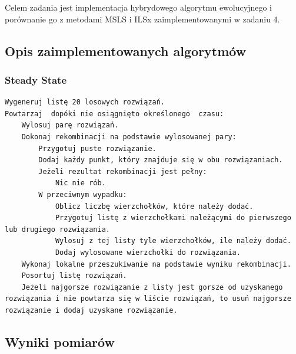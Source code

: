 \documentclass[a4paper]{article}
\begin{document}
Celem zadania jest implementacja hybrydowego algorytmu ewolucyjnego i porównanie go z metodami MSLS i ILSx zaimplementowanymi w zadaniu 4.

\subsection{Opis zaimplementowanych algorytmów}

\subsubsection{Steady State}

\begin{lstlisting}
Wygeneruj listę 20 losowych rozwiązań.
Powtarzaj  dopóki nie osiągnięto określonego  czasu:
    Wylosuj parę rozwiązań.
    Dokonaj rekombinacji na podstawie wylosowanej pary:
        Przygotuj puste rozwiązanie.
        Dodaj każdy punkt, który znajduje się w obu rozwiązaniach.
        Jeżeli rezultat rekombinacji jest pełny:
            Nic nie rób.
        W przeciwnym wypadku:
            Oblicz liczbę wierzchołków, które należy dodać.
            Przygotuj listę z wierzchołkami należącymi do pierwszego lub drugiego rozwiązania.
            Wylosuj z tej listy tyle wierzchołków, ile należy dodać.
            Dodaj wylosowane wierzchołki do rozwiązania.
    Wykonaj lokalne przeszukiwanie na podstawie wyniku rekombinacji.
    Posortuj listę rozwiązań.
    Jeżeli najgorsze rozwiązanie z listy jest gorsze od uzyskanego rozwiązania i nie powtarza się w liście rozwiązań, to usuń najgorsze rozwiązanie i dodaj uzyskane rozwiązanie.
\end{lstlisting}

\subsection{Wyniki pomiarów}
\end{document}
